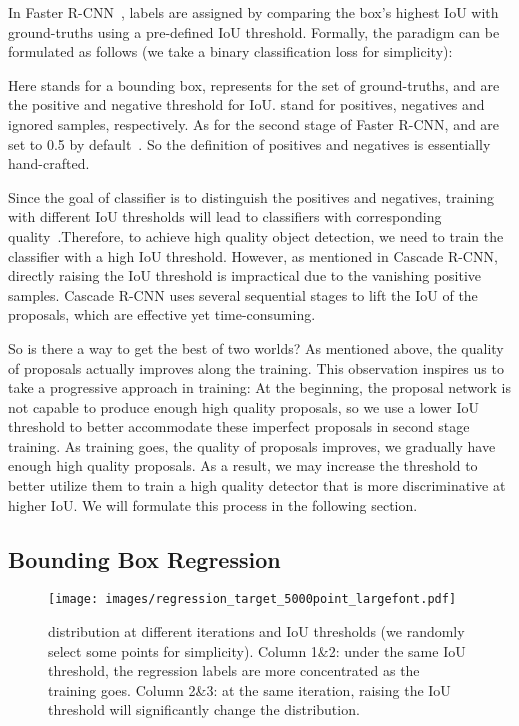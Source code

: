 \documentclass[runningheads]{llncs}
\begin{document}
In Faster R-CNN~\cite{FasterRCNN}, labels are assigned by comparing the box's highest IoU with ground-truths using a pre-defined IoU threshold. Formally, the paradigm can be formulated as follows (we take a binary classification loss for simplicity):



Here  stands for a bounding box,  represents for the set of ground-truths,  and  are the positive and negative threshold for IoU.  stand for positives, negatives and ignored samples, respectively. As for the second stage of Faster R-CNN,  and  are set to 0.5 by default~\cite{Detectron2018}. So the definition of positives and negatives is essentially hand-crafted.

Since the goal of classifier is to distinguish the positives and negatives, training with different IoU thresholds will lead to classifiers with corresponding quality~\cite{CascadeRCNN}.Therefore, to achieve high quality object detection, we need to train the classifier with a high IoU threshold. However, as mentioned in Cascade R-CNN, directly raising the IoU threshold is impractical due to the vanishing positive samples. Cascade R-CNN uses several sequential stages to lift the IoU of the proposals, which are effective yet time-consuming.

So is there a way to get the best of two worlds? As mentioned above, the quality of proposals actually improves along the training. This observation inspires us to take a progressive approach in training: At the beginning, the proposal network is not capable to produce enough high quality proposals, so we use a lower IoU threshold to better accommodate these imperfect proposals in second stage training. As training goes, the quality of proposals improves, we gradually have enough high quality proposals. As a result, we may increase the threshold to better utilize them to train a high quality detector that is more discriminative at higher IoU. We will formulate this process in the following section.


\subsection{Bounding Box Regression}
\label{sec:analysis_reg}

\begin{figure}[!t]
    \centering
    \texttt{[image: images/regression\_target\_5000point\_largefont.pdf]}
    \caption{ distribution at different iterations and IoU thresholds (we randomly select some points for simplicity). Column 1\&2: under the same IoU threshold, the regression labels are more concentrated as the training goes. Column 2\&3: at the same iteration, raising the IoU threshold will significantly change the distribution.}
    \label{fig:reg_target_over_time}
\end{figure}
\end{document}
